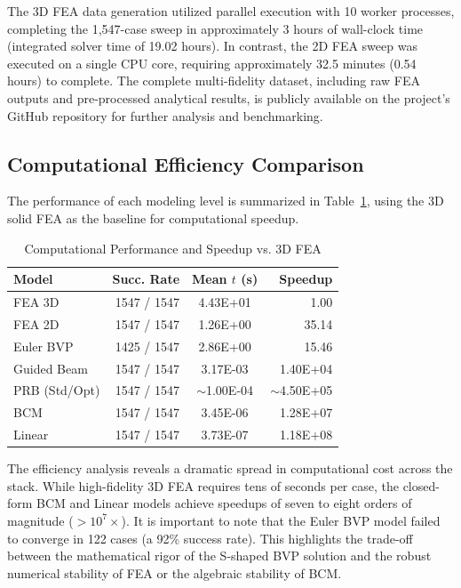 \documentclass[colorlinks,upint,subscriptcorrection,varvw,hyphenate,balance]{asmeconf} %
\begin{document}
The 3D FEA data generation utilized parallel execution with 10 worker processes, completing the 1,547-case sweep in approximately 3 hours of wall-clock time (integrated solver time of 19.02 hours). In contrast, the 2D FEA sweep was executed on a single CPU core, requiring approximately 32.5 minutes (0.54 hours) to complete. The complete multi-fidelity dataset, including raw FEA outputs and pre-processed analytical results, is publicly available on the project's GitHub repository for further analysis and benchmarking.

\subsection{Computational Efficiency Comparison}
The performance of each modeling level is summarized in Table~\ref{tab:runtime_comparison}, using the 3D solid FEA as the baseline for computational speedup.
\begin{table}[ht]
\centering
\caption{Computational Performance and Speedup vs. 3D FEA}
\label{tab:runtime_comparison}
\begin{tabular}{lrcr}
\toprule
\textbf{Model} & \textbf{Succ. Rate} & \textbf{Mean $t$ (s)} & \textbf{Speedup} \\
\midrule
FEA 3D & 1547 / 1547 & 4.43E+01 & 1.00 \\
FEA 2D & 1547 / 1547 & 1.26E+00 & 35.14 \\
Euler BVP & 1425 / 1547 & 2.86E+00 & 15.46 \\
Guided Beam & 1547 / 1547 & 3.17E-03 & 1.40E+04 \\
PRB (Std/Opt) & 1547 / 1547 & $\sim$1.00E-04 & $\sim$4.50E+05 \\
BCM & 1547 / 1547 & 3.45E-06 & 1.28E+07 \\
Linear & 1547 / 1547 & 3.73E-07 & 1.18E+08 \\
\bottomrule
\end{tabular}
\end{table}

The efficiency analysis reveals a dramatic spread in computational cost across the stack. While high-fidelity 3D FEA requires tens of seconds per case, the closed-form BCM and Linear models achieve speedups of seven to eight orders of magnitude ($>10^7\times$). It is important to note that the Euler BVP model failed to converge in 122 cases (a 92\% success rate). This highlights the trade-off between the mathematical rigor of the S-shaped BVP solution and the robust numerical stability of FEA or the algebraic stability of BCM.
\end{document}

